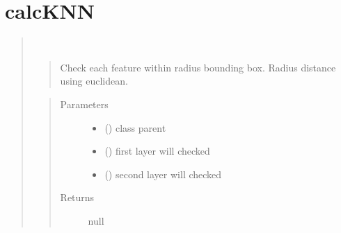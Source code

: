 \documentclass[letterpaper,10pt,english]{sphinxmanual}
\begin{document}
\section{calcKNN}
\label{\detokenize{similarity_method:calcknn}}\begin{quote}

\begin{fulllineitems}
\label{\detokenize{similarity_method:calcKNN}}~\begin{quote}

Check each feature within radius bounding box. Radius distance using euclidean.
\end{quote}
\begin{quote}\begin{description}
\item[{Parameters}] \leavevmode\begin{itemize}
\item {} 
 () \textendash{} class parent

\item {} 
 () \textendash{} first layer will checked

\item {} 
 () \textendash{} second layer will checked

\end{itemize}

\item[{Returns}] \leavevmode
null

\end{description}\end{quote}

\end{fulllineitems}

\end{quote}
\end{document}
